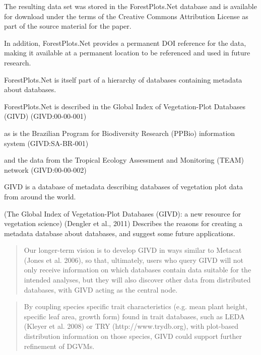 \documentclass{article}
\begin{document}
The resulting data set was stored in 
the ForestPlots.Net database and is available for download
under the terms of the 
Creative Commons Attribution License
as part of the source material for the paper.

In addition, ForestPlots.Net provides a permanent DOI reference for the data,
making it available at a permanent location to be referenced and used in future
research.

ForestPlots.Net is itself part of a hierarchy of databases containing metadata
about databases.

ForestPlots.Net is described in the
Global Index of Vegetation-Plot Databases (GIVD)
(GIVD:00-00-001)

as is the Brazilian Program for Biodiversity Research (PPBio) information system
(GIVD:SA-BR-001)

and the data from the 
Tropical Ecology Assessment and Monitoring (TEAM)
network
(GIVD:00-00-002)

GIVD is a database of metadata describing databases of vegetation plot data
from around the world.

(The Global Index of Vegetation-Plot Databases (GIVD): a new resource for vegetation science)
(Dengler et al., 2011)
Describes the reasons for creating a metadata database about databases, and
suggest some future applications.

\begin{quote}
Our longer-term vision is to develop GIVD in ways similar to Metacat (Jones et
al. 2006), so that, ultimately, users who query GIVD will not only receive
information on which databases contain data suitable for the intended analyses,
but they will also discover other data from distributed databases, with GIVD
acting as the central node.
\end{quote}

\begin{quote}
By coupling species
specific trait characteristics (e.g. mean plant height, specific leaf area,
growth form) found in trait databases, such
as LEDA (Kleyer et al. 2008) or TRY (http://www.trydb.org),
with plot-based distribution information on those
species, GIVD could support further refinement of DGVMs.
\end{quote}
\end{document}
